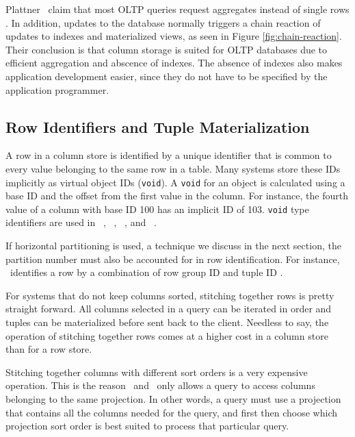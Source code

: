 Plattner \ea~claim that most OLTP queries request aggregates instead of single rows \cite{Plattner2014-fr}. In addition, updates to the database normally triggers a chain reaction of updates to indexes and materialized views, as seen in Figure \ref{fig:chain-reaction}. Their conclusion is that column storage is suited for OLTP databases due to efficient aggregation and abscence of indexes. The absence of indexes also makes application development easier, since they do not have to be specified by the application programmer.

\subsection{Row Identifiers and Tuple Materialization}
\label{sub:Row Identifiers and Tuple Materialization}
A row in a column store is identified by a unique identifier that is common to every value belonging to the same row in a table. Many systems store these IDs implicitly as virtual object IDs (\texttt{void}). A \texttt{void} for an object is calculated using a base ID and the offset from the first value in the column. For instance, the fourth value of a column with base ID 100 has an implicit ID of 103. \texttt{void} type identifiers are used in \monetdb~\cite{Boncz2002-yj}, \cstore~\cite{Stonebraker2005-qz}, \vertica~\cite{Lamb2012-kg}, and \ibm~\cite{Raman2013-em}.

If horizontal partitioning is used, a technique we discuss in the next section, the partition number must also be accounted for in row identification. For instance, \mssql~identifies a row by a combination of row group ID and tuple ID \cite{Larson2013-mc}.

For systems that do not keep columns sorted, stitching together rows is pretty straight forward. All columns selected in a query can be iterated in order and tuples can be materialized before sent back to the client. Needless to say, the operation of stitching together rows comes at a higher cost in a column store than for a row store.

Stitching together columns with different sort orders is a very expensive operation. This is the reason \cstore~and \vertica~only allows a query to access columns belonging to the same projection. In other words, a query must use a projection that contains all the columns needed for the query, and first then choose which projection sort order is best suited to process that particular query.

